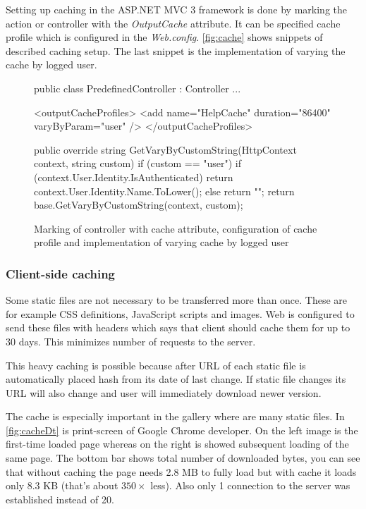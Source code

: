 Setting up caching in the ASP.NET MVC 3 framework is done by marking the action or controller with the \emph{OutputCache} attribute.
It can be specified cache profile which is configured in the \emph{Web.config}.
\autoref{fig:cache} shows snippets of described caching setup.
The last snippet is the implementation of varying the cache by logged user.


\begin{figure}[h!]
	\begin{Csharp}
[OutputCache(CacheProfile = "HelpCache")]
public class PredefinedController : Controller { ... }
	\end{Csharp}

	\begin{XML}
<outputCacheProfiles>
	<add name="HelpCache" duration="86400" varyByParam="user" />
</outputCacheProfiles>
	\end{XML}

	\begin{Csharp}
public override string GetVaryByCustomString(HttpContext context, string custom) {
	if (custom == "user") {
		if (context.User.Identity.IsAuthenticated) {
			return context.User.Identity.Name.ToLower();
		}
		else {
			return "";
		}
	}
	return base.GetVaryByCustomString(context, custom);
}
	\end{Csharp}
	
	\caption{Marking of controller with cache attribute, configuration of cache profile and implementation of varying cache by logged user}
	\label{fig:cache}
\end{figure}


\subsubsection{Client-side caching}

Some static files are not necessary to be transferred more than once.
These are for example CSS definitions, JavaScript scripts and images.
Web is configured to send these files with headers which says that client should cache them for up to 30 days.
This minimizes number of requests to the server.

This heavy caching is possible because after URL of each static file is automatically placed hash from its date of last change.
If static file changes its URL will also change and user will immediately download newer version.

The cache is especially important in the gallery where are many static files.
In \autoref{fig:cacheDt} is print-screen of Google Chrome developer.
On the left image is the first-time loaded page whereas on the right is showed subsequent loading of the same page.
The bottom bar shows total number of downloaded bytes, you can see that without caching the page needs 2.8 MB to fully load but with cache it loads only 8.3 KB (that's about $350 \times$ less).
Also only 1 connection to the server was established instead of 20.

